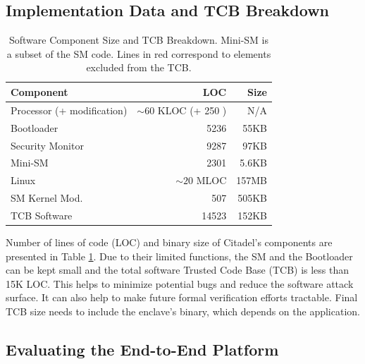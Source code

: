 \subsection{Implementation Data and TCB Breakdown}
\begin{table}
    \centering
    \begin{tabular}{|p{2.35cm}|r|r|}
        \hline
         Component & LOC & Size\\
         \hline\hline
         Processor \cite{bourgeat2019mi6} (+ modification) & $\sim60$ KLOC (+ 250 ) & N/A \\
         \hline
         Bootloader & 5236 & 55KB\\
         \hline
         Security Monitor & 9287 & 97KB\\
         \hline
         \rowcolor{LightRedbis}
         Mini-SM & 2301 & 5.6KB\\
         \hline
         \rowcolor{LightRed}
         Linux & $\sim20$ MLOC & 157MB\\
         \hline
         \rowcolor{LightRed}
         SM Kernel Mod. & 507 & 505KB\\
         \hline
         \hline
         TCB Software & 14523 & 152KB \\
         \hline
    \end{tabular}
    \vspace{0.40cm}
    \caption{Software Component Size and TCB Breakdown. Mini-SM is a subset of the SM code. 
    Lines in red correspond to elements excluded from the TCB.}
    \label{tab:tcbloc}
\end{table}

Number of lines of code (LOC) and binary size of Citadel's components are presented in Table \ref{tab:tcbloc}.
Due to their limited functions, the SM and the Bootloader can be kept small and the total software Trusted Code Base (TCB) is less than 15K LOC.
This helps to minimize potential bugs and reduce the software attack surface.
It can also help to make future formal verification efforts tractable.
Final TCB size needs to include the enclave's binary, which depends on the application. 

\subsection{Evaluating the End-to-End Platform}

